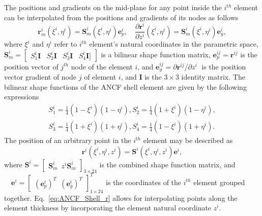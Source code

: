 The positions and gradients on the mid-plane for any point inside the $i^{th}$ element can be interpolated from the positions and gradients of its nodes as follows
\begin{equation} \label{eq:ANCF_Shell_coordinates}
\mathbf{r}_{m}^{i}({{\xi}^{i}},{{\eta}^{i}})=\mathbf{S}_{m}^{i}({{\xi}^{i}},{{\eta}^{i}})\mathbf{e}_{p}^{i},\quad \frac{\partial {{\mathbf{r}}^{i}}}{\partial {{z}^{i}}}({{\xi}^{i}},{{\eta}^{i}})=\mathbf{S}_{m}^{i}({{\xi}^{i}},{{\eta}^{i}})\mathbf{e}_{g}^{i},
\end{equation}
where $\xi^i$ and $\eta^i$ refer to $i^{th}$ element's natural coordinates in the parametric space, $\mathbf{S}_{m}^{i}=\begin{bmatrix}
S_{1}^{i}\mathbf{I}& S_{2}^{i}\mathbf{I}& S_{3}^{i}\mathbf{I}&  S_{4}^{i}\mathbf{I}] \end{bmatrix}$ is a bilinear shape function matrix, $\mathbf{e}_{p}^{ij}={{\mathbf{r}}^{ij}}$ is the position vector of $j^{th}$ node of the element $i$, and $\mathbf{e}_{g}^{ij}={\partial {{\mathbf{r}}^{ij}}}/{\partial {{z}^{i}}}\;$ is the position vector gradient of node $j$ of element $i$, and $\textbf{I}$ is the $3\times 3$ identity matrix.
The bilinear shape functions of the ANCF shell element are given by the following expressions
\begin{equation*} \label{eq:ANCF_Shell_Shapefunctions}
\begin{split}
S_{1}^{i}=\frac{1}{4}(1-{{\xi }^{i}})(1-{{\eta }^{i}}), S_{2}^{i}=\frac{1}{4}(1+{{\xi }^{i}})(1-{{\eta }^{i}}),\\
S_{3}^{i}=\frac{1}{4}(1+{{\xi }^{i}})(1+{{\eta }^{i}}), S_{4}^{i}=\frac{1}{4}(1-{{\xi }^{i}})(1+{{\eta }^{i}}).
\end{split}
\end{equation*}
The position of an arbitrary point in the $i^{th}$ element may be described as
\begin{equation} \label{eq:ANCF_Shell_r}
{{\mathbf{r}}^{i}}({\xi}^i,{\eta}^i,{z}^i)={{\mathbf{S}}^{i}}({\xi}^i,{\eta}^i,{z}^i){{\mathbf{e}}^{i}},
\end{equation}
where ${{\mathbf{S}}^{i}}=[\begin{matrix} \mathbf{S}_{m}^{i} \,\,\, {{z}^{i}}\mathbf{S}_{m}^{i}\end{matrix}]_{3\times 24}$ is the combined shape function matrix, and $\quad {{\mathbf{e}}^{i}}= [{ \begin{matrix} {{(\mathbf{e}_{p}^{i})}^{T}} \,\,\, {{(\mathbf{e}_{g}^{i})}^{T}}\end{matrix}}]_{1\times 24}^T$ is the coordinates of the $i^{th}$ element grouped together. Eq.~\ref{eq:ANCF_Shell_r} allows for interpolating points along the element thickness by incorporating the element natural coordinate $z^i$.
